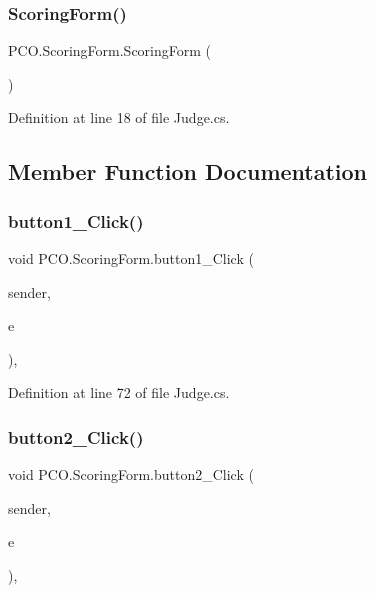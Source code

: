 \subsubsection{\texorpdfstring{Scoring\+Form()}{ScoringForm()}}
{\footnotesize\ttfamily P\+C\+O.\+Scoring\+Form.\+Scoring\+Form (\begin{DoxyParamCaption}{ }\end{DoxyParamCaption})\hspace{0.3cm}{\ttfamily [inline]}}



Definition at line 18 of file Judge.\+cs.



\subsection{Member Function Documentation}
\mbox{\label{classPCO_1_1ScoringForm_a3f81239c06e065c3d3985500b7c5a02a}} 
\subsubsection{\texorpdfstring{button1\+\_\+\+Click()}{button1\_Click()}}
{\footnotesize\ttfamily void P\+C\+O.\+Scoring\+Form.\+button1\+\_\+\+Click (\begin{DoxyParamCaption}\item[{object}]{sender,  }\item[{Event\+Args}]{e }\end{DoxyParamCaption})\hspace{0.3cm}{\ttfamily [inline]}, {\ttfamily [private]}}



Definition at line 72 of file Judge.\+cs.

\mbox{\label{classPCO_1_1ScoringForm_a6ccafd7c455760316b3b19122b91f6d3}} 
\subsubsection{\texorpdfstring{button2\+\_\+\+Click()}{button2\_Click()}}
{\footnotesize\ttfamily void P\+C\+O.\+Scoring\+Form.\+button2\+\_\+\+Click (\begin{DoxyParamCaption}\item[{object}]{sender,  }\item[{Event\+Args}]{e }\end{DoxyParamCaption})\hspace{0.3cm}{\ttfamily [inline]}, {\ttfamily [private]}}



